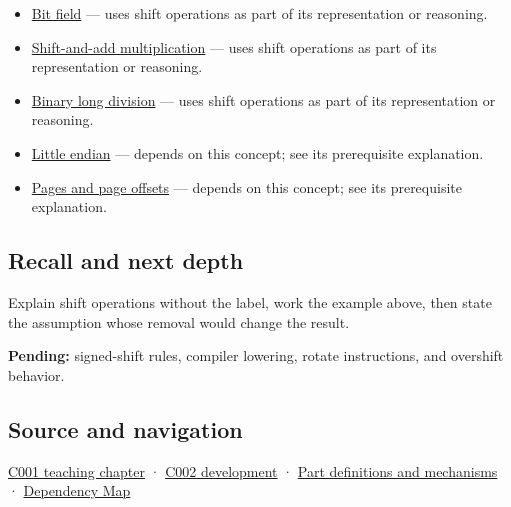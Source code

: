 \begin{itemize}
\item
  \hyperref[appendix-ac697f5c66e8]{Bit field} --- uses shift operations as part of its representation or reasoning.
\item
  \hyperref[appendix-a65290d66ed9]{Shift-and-add multiplication} --- uses shift operations as part of its representation or reasoning.
\item
  \hyperref[appendix-89985e6a2685]{Binary long division} --- uses shift operations as part of its representation or reasoning.
\item
  \hyperref[appendix-367b6abf460e]{Little endian} --- depends on this concept; see its prerequisite explanation.
\item
  \hyperref[appendix-0c67cd5bf30a]{Pages and page offsets} --- depends on this concept; see its prerequisite explanation.
\end{itemize}

\subsection{Recall and next depth}\label{appendix-73425b25118e-recall-and-next-depth}

Explain shift operations without the label, work the example above, then state the assumption whose removal would change the result.

\textbf{Pending:} signed-shift rules, compiler lowering, rotate instructions, and overshift behavior.

\subsection{Source and navigation}\label{appendix-73425b25118e-source-and-navigation}

\hyperref[01-foundations-i-ch001-from-a-signal-to-an-interpretation]{C001 teaching chapter} · \hyperref[01-foundations-i-ch001-arithmetic-becomes-a-policy]{C002 development} · \hyperref[appendix-fd090d982a15]{Part definitions and mechanisms} · \hyperref[appendix-4ad47bdd269a]{Dependency Map}
